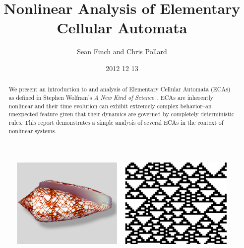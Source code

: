 \documentclass{article}
\author{Sean Finch and Chris Pollard}
\date{2012 12 13}
\title{Nonlinear Analysis of Elementary Cellular Automata}
\begin{document}
\maketitle

\vspace{0.5in}

\begin{figure}[h!]
    \centering
    \includegraphics[width=\textwidth]{shell-automata.eps}
\end{figure}

\vspace{0.5in}

\begin{abstract}
    We present an introduction to and analysis of Elementary Cellular
    Automata (ECAs) as defined in Stephen Wolfram's
    \emph{A New Kind of Science}~\cite{anks}.
    ECAs are inherently nonlinear and their time evolution can
    exhibit extremely complex behavior--an unexpected feature given
    that their dynamics are governed by completely deterministic
    rules.
    This report demonstrates a simple analysis of several ECAs in the
    context of nonlinear systems.
\end{abstract}

\newpage









\end{document}
